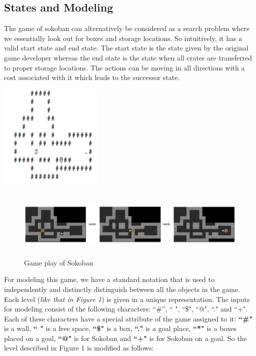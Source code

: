 \documentclass[10pt, final]{article}
\begin{document}
\begin{multicols}{2}
	\section{States and Modeling}
	The game of sokoban can alternatively be considered as a search problem where we essentially look out for boxes and storage locations. So intuitively, it has a valid start state and end state. The start state is the state given by the original game developer whereas the end state is the state when all crates are transferred to proper storage locations. The actions can be moving in all directions with a cost associated with it which leads to the successor state. 
		\begin{center}
		\centering
		\includegraphics[width=5cm, height=5cm]{pic4.png}
	\end{center}
	\begin{figure}
	\centering
	\includegraphics[height=1.3in]{fig.png}
	\caption{Game play of Sokoban}
	\label{fig:chain}
\end{figure}
	For modeling this game, we have a standard notation that is used to independently and distinctly distinguish between all the objects in the game. Each level (\textit{like that in Figure 1}) is given in a unique representation. The inputs for modeling consist of the following characters: ``\#'', `` ", ``\$", ``@", ``." and ``+". Each of these characters have a special attribute of the game assigned to it: \textbf{``\#"} is a wall,  \textbf{`` "} is a free space, \textbf{``\$"} is a box, \textbf{``."} is a goal place,  \textbf{``*"} is a boxes placed on a goal, \textbf{``@"} is for Sokoban and \textbf{``+"} is for Sokoban on a goal. So the level described in Figure 1 is modified as follows:  \\

\end{multicols}
\end{document}
